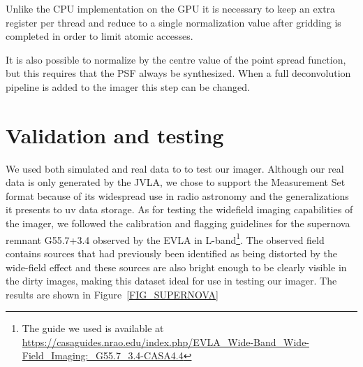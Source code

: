 Unlike the CPU implementation on the GPU it is necessary to keep an extra register per thread and reduce to a single normalization value after gridding is completed in order to limit atomic accesses.

It is also possible to normalize by the centre value of the point spread function, but this requires that the PSF always be synthesized. When a full deconvolution pipeline is added to the imager this step
can be changed.

\section{Validation and testing}
We used both simulated and real data to to test our imager. Although our real data is only generated
by the JVLA, we chose to support the Measurement Set format because of its widespread use in radio astronomy and the generalizations it presents to
uv data storage.  As for testing the  widefield imaging capabilities of the imager, we followed the calibration and flagging guidelines for the supernova 
remnant G55.7+3.4 observed by the EVLA in L-band\footnote{The guide we used is available at \url{https://casaguides.nrao.edu/index.php/EVLA_Wide-Band_Wide-Field_Imaging:_G55.7_3.4-CASA4.4}}.
The observed field contains sources that had previously been identified as being distorted by the wide-field effect and these sources are also bright enough to be clearly visible in 
the dirty images, making this dataset ideal for use in testing our imager. The results are shown in Figure~\ref{FIG_SUPERNOVA}

